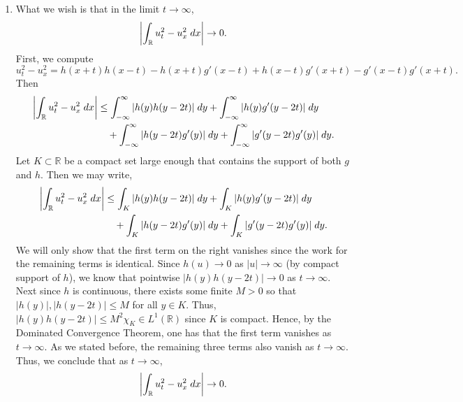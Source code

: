\documentclass{article}
\numberwithin{equation}{section}
\begin{document}
\begin{enumerate}[itemsep =-2pt,label = (\roman{*})]
		where there is no boundary term since $u_x, u_t$ are supported inside $K_T$. So we have shown that $\dot{e}(t) = 0$ for all $0 \leq t \leq T$. Since $T > 0$ was chosen arbitrarily, it follows that $\dot{e}(t)\equiv 0$. Therefore, the total energy is constant in $t$. 
		\item What we wish is that in the limit $t \to \infty$, 
		\begin{equation*}
			\left| \int_{\mathbb{R}}u_t^2 - u_x^2\;dx \right| \to 0. 
		\end{equation*}
		First, we compute 
		\begin{equation*}
			u_t^2 - u_x^2 = h(x + t)h(x - t) - h(x + t)g'(x - t) + h(x - t)g'(x + t) - g'(x - t)g'(x + t). 
		\end{equation*}
		Then 
		\begin{align*}
			\begin{split}
				\left| \int_{\mathbb{R}}u_t^2 - u_x^2\;dx \right| &\leq \int_{-\infty}^{\infty}|h(y)h(y - 2t)|\;dy + \int_{-\infty}^{\infty}|h(y)g'(y - 2t)|\;dy \\
				&\quad+ \int_{-\infty}^{\infty}|h(y - 2t)g'(y)|\;dy + \int_{-\infty}^{\infty}|g'(y - 2t)g'(y)|\;dy.
			\end{split}
		\end{align*}
		Let $K \subset \mathbb{R}$ be a compact set large enough that contains the support of both $g$ and $h$. Then we may write, 
		\begin{align*}
			\begin{split}
				\left| \int_{\mathbb{R}}u_t^2 - u_x^2\;dx \right| &\leq \int_{K}|h(y)h(y - 2t)|\;dy + \int_{K}|h(y)g'(y - 2t)|\;dy \\
				&\quad+ \int_{K}|h(y - 2t)g'(y)|\;dy + \int_{K}|g'(y - 2t)g'(y)|\;dy.
			\end{split}
		\end{align*}
		We will only show that the first term on the right vanishes since the work for the remaining terms is identical. Since $h(u) \to 0$ as $|u| \to \infty$ (by compact support of $h$), we know that pointwise $|h(y)h(y - 2t)| \to 0$ as $t \to \infty$. Next since $h$ is continuous, there exists some finite $M > 0$ so that $|h(y)|, |h(y - 2t)| \leq M$ for all $y \in K$. Thus, $|h(y)h(y-2t)| \leq M^2\chi_{K} \in L^1(\mathbb{R})$ since $K$ is compact. Hence, by the Dominated Convergence Theorem, one has that the first term vanishes as $t \to \infty$. As we stated before, the remaining three terms also vanish as $t \to \infty$. Thus, we conclude that as $t \to \infty$,
		\begin{equation*}
			\left| \int_{\mathbb{R}}u_t^2 - u_x^2\;dx \right| \to 0. 
		\end{equation*}
	\end{enumerate}
	
\end{document}
